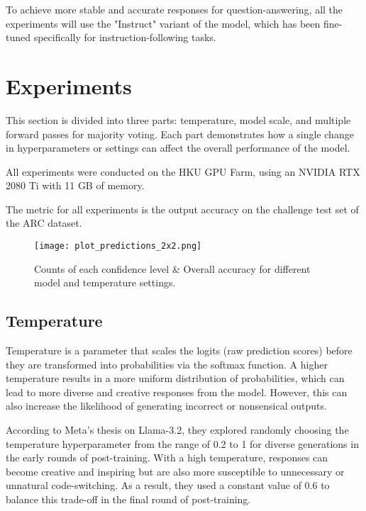 \documentclass[
	a4paper, %
	10pt, %
	twoside, %
]{LTJournalArticle}
\begin{document}
To achieve more stable and accurate responses for question-answering, all the experiments will use the "Instruct" variant of the model, which has been fine-tuned specifically for instruction-following tasks.


\section{Experiments}

This section is divided into three parts: temperature, model scale, and multiple forward passes for majority voting. Each part demonstrates how a single change in hyperparameters or settings can affect the overall performance of the model.

All experiments were conducted on the HKU GPU Farm, using an NVIDIA RTX 2080 Ti with 11 GB of memory.

The metric for all experiments is the output accuracy on the challenge test set of the ARC dataset.

\begin{figure*} %
	\texttt{[image: plot\_predictions\_2x2.png]}
	\caption{Counts of each confidence level \& Overall accuracy for different model and temperature settings.}
	\label{fig:2x2plot}
\end{figure*}

\subsection{Temperature}

Temperature is a parameter that scales the logits (raw prediction scores) before they are transformed into probabilities via the softmax function. A higher temperature results in a more uniform distribution of probabilities, which can lead to more diverse and creative responses from the model. However, this can also increase the likelihood of generating incorrect or nonsensical outputs.

According to Meta's thesis on Llama-3.2\autocite{dubey2024llama3herdmodels}, they explored randomly choosing the temperature hyperparameter from the range of 0.2 to 1 for diverse generations in the early rounds of post-training. With a high temperature, responses can become creative and inspiring but are also more susceptible to unnecessary or unnatural code-switching. As a result, they used a constant value of 0.6 to balance this trade-off in the final round of post-training.
\end{document}
